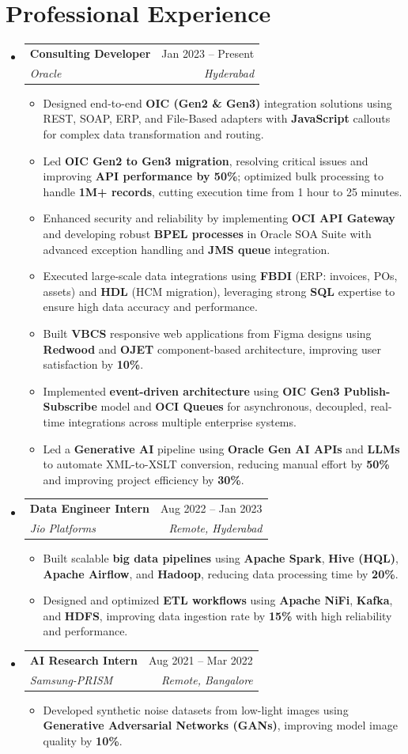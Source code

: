 \documentclass[letterpaper,11pt]{article}
\makeatletter
\newcommand{\resumeItem}[1]{
  \item\small{
    {#1 \vspace{-2pt}}
  }
}
\newcommand{\resumeSubheading}[4]{
  \vspace{-2pt}\item
    \begin{tabular*}{0.97\textwidth}[t]{l@{\extracolsep{\fill}}r}
      \textbf{#1} & #2 \\
      \textit{\small#3} & \textit{\small #4} \\
    \end{tabular*}\vspace{-7pt}
}
\newcommand{\resumeSubHeadingListStart}{\begin{itemize}[leftmargin=0.15in, label={}]}
\newcommand{\resumeSubHeadingListEnd}{\end{itemize}}
\newcommand{\resumeItemListStart}{\begin{itemize}}
\newcommand{\resumeItemListEnd}{\end{itemize}\vspace{-5pt}}
\makeatother
\begin{document}
\section{Professional Experience}
\resumeSubHeadingListStart
    \resumeSubheading
      {Consulting Developer}{Jan 2023 -- Present}
      {Oracle}{Hyderabad}
      \resumeItemListStart
        \resumeItem{Designed end-to-end \textbf{OIC (Gen2 \& Gen3)} integration solutions using REST, SOAP, ERP, and File-Based adapters with \textbf{JavaScript} callouts for complex data transformation and routing.}
        \resumeItem{Led \textbf{OIC Gen2 to Gen3 migration}, resolving critical issues and improving \textbf{API performance by 50\%}; optimized bulk processing to handle \textbf{1M+ records}, cutting execution time from 1 hour to 25 minutes.}
        \resumeItem{Enhanced security and reliability by implementing \textbf{OCI API Gateway} and developing robust \textbf{BPEL processes} in Oracle SOA Suite with advanced exception handling and \textbf{JMS queue} integration.}
        \resumeItem{Executed large-scale data integrations using \textbf{FBDI} (ERP: invoices, POs, assets) and \textbf{HDL} (HCM migration), leveraging strong \textbf{SQL} expertise to ensure high data accuracy and performance.}
        \resumeItem{Built \textbf{VBCS} responsive web applications from Figma designs using \textbf{Redwood} and \textbf{OJET} component-based architecture, improving user satisfaction by \textbf{10\%}.}
        \resumeItem{Implemented \textbf{event-driven architecture} using \textbf{OIC Gen3 Publish-Subscribe} model and \textbf{OCI Queues} for asynchronous, decoupled, real-time integrations across multiple enterprise systems.}
        \resumeItem{Led a \textbf{Generative AI} pipeline using \textbf{Oracle Gen AI APIs} and \textbf{LLMs} to automate XML-to-XSLT conversion, reducing manual effort by \textbf{50\%} and improving project efficiency by \textbf{30\%}.}
      \resumeItemListEnd
    \resumeSubheading
      {Data Engineer Intern}{Aug 2022 -- Jan 2023}
      {Jio Platforms}{Remote, Hyderabad}
      \resumeItemListStart
        \resumeItem{Built scalable \textbf{big data pipelines} using \textbf{Apache Spark}, \textbf{Hive (HQL)}, \textbf{Apache Airflow}, and \textbf{Hadoop}, reducing data processing time by \textbf{20\%}.}
        \resumeItem{Designed and optimized \textbf{ETL workflows} using \textbf{Apache NiFi}, \textbf{Kafka}, and \textbf{HDFS}, improving data ingestion rate by \textbf{15\%} with high reliability and performance.}
      \resumeItemListEnd
    \resumeSubheading
      {AI Research Intern}{Aug 2021 -- Mar 2022}
      {Samsung-PRISM}{Remote, Bangalore}
      \resumeItemListStart
        \resumeItem{Developed synthetic noise datasets from low-light images using \textbf{Generative Adversarial Networks (GANs)}, improving model image quality by \textbf{10\%}.}
      \resumeItemListEnd
\resumeSubHeadingListEnd
\end{document}
